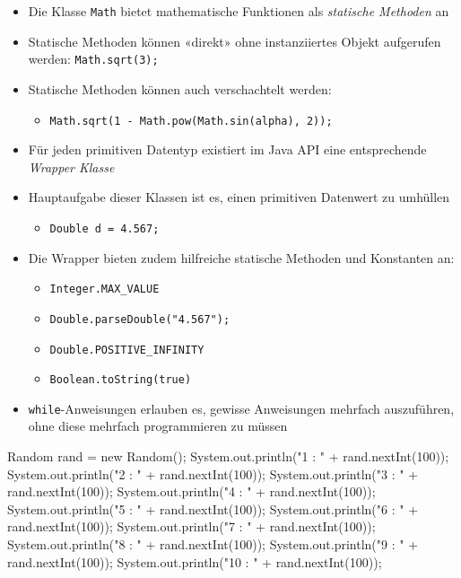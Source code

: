 \documentclass[a4paper,10pt, dvipsnames]{report}
\newcommand{\javaInLine}[1]{\texttt{#1}}
\begin{document}
\begin{itemize}
    \item Die Klasse \javaInLine{Math} bietet mathematische Funktionen als \textit{statische Methoden} an
    \item Statische Methoden können «direkt» ohne instanziiertes Objekt aufgerufen werden: \javaInLine{Math.sqrt(3);}
    \item Statische Methoden können auch verschachtelt werden:
    \begin{itemize}
        \item \javaInLine{Math.sqrt(1 - Math.pow(Math.sin(alpha), 2));}
    \end{itemize}
    \item Für jeden primitiven Datentyp existiert im Java API eine entsprechende \textit{Wrapper Klasse}
    \item Hauptaufgabe dieser Klassen ist es, einen primitiven Datenwert zu umhüllen
    \begin{itemize}
        \item \javaInLine{Double d = 4.567;}
    \end{itemize}
    \item Die Wrapper bieten zudem hilfreiche statische Methoden und Konstanten an:
    \begin{itemize}
        \item \javaInLine{Integer.MAX_VALUE}
        \item \javaInLine{Double.parseDouble("4.567");}
        \item \javaInLine{Double.POSITIVE_INFINITY}
        \item \javaInLine{Boolean.toString(true)}
    \end{itemize}
    \item \javaInLine{while}-Anweisungen erlauben es, gewisse Anweisungen mehrfach auszuführen, ohne diese mehrfach programmieren zu müssen
\end{itemize}

\begin{javacodebox}
    Random rand = new Random();
    System.out.println("1 : " + rand.nextInt(100));
    System.out.println("2 : " + rand.nextInt(100));
    System.out.println("3 : " + rand.nextInt(100));
    System.out.println("4 : " + rand.nextInt(100));
    System.out.println("5 : " + rand.nextInt(100));
    System.out.println("6 : " + rand.nextInt(100));
    System.out.println("7 : " + rand.nextInt(100));
    System.out.println("8 : " + rand.nextInt(100));
    System.out.println("9 : " + rand.nextInt(100));
    System.out.println("10 : " + rand.nextInt(100));
\end{javacodebox}
\end{document}
